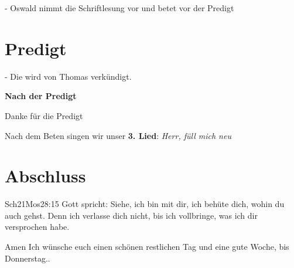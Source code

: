 \documentclass{../inc/mybib}
\begin{document}
- Oswald nimmt die Schriftlesung vor und betet vor der Predigt

\section{Predigt}
- Die wird von Thomas verkündigt.

\textbf{Nach der Predigt}

Danke für die Predigt

Nach dem Beten singen wir unser \textbf{3. Lied}: \textit{Herr, füll mich neu}\\

\section{Abschluss}

\begin{bibeltext}{Sch2}{1Mos}{28:15}
Gott spricht: Siehe, ich bin mit dir,
ich behüte dich, wohin du auch gehst.
Denn ich verlasse dich nicht,
bis ich vollbringe, was ich dir versprochen habe.
\end{bibeltext}
Amen
Ich wünsche euch einen schönen restlichen Tag und eine gute Woche, bis Donnerstag..
\end{document}

